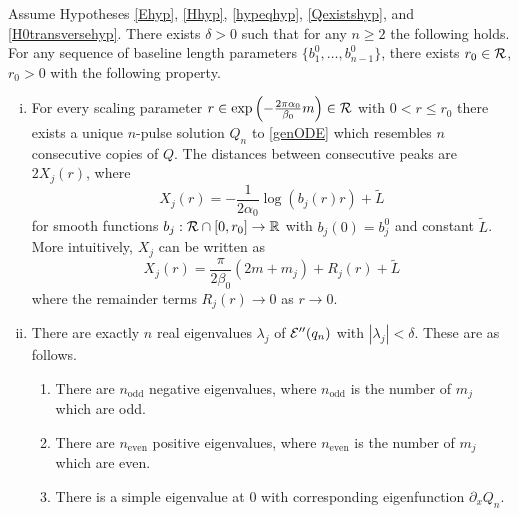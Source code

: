 \documentclass[thesis.tex]{subfiles}
\begin{document}
\begin{theorem}\label{multipulseexistR}
Assume Hypotheses \ref{Ehyp}, \ref{Hhyp}, \ref{hypeqhyp}, \ref{Qexistshyp}, and \ref{H0transversehyp}. There exists $\delta > 0$ such that for any $n \geq 2$ the following holds. For any sequence of baseline length parameters $\{ b_1^0, \dots, b_{n-1}^0 \}$, there exists $r_0 \in \mathcal{R}$, $r_0 > 0$ with the following property.
\begin{enumerate}[(i)]
\item For every scaling parameter $r \in \mathop\mathrm{exp}\nolimits\left(-\frac{2 \pi \alpha_0}{\beta_0}m \right) \in \mathcal{R}$ with $0 < r \leq r_0$ there exists a unique $n$-pulse solution $Q_n$ to \cref{genODE} which resembles $n$ consecutive copies of $Q$. The distances between consecutive peaks are $2 X_j(r)$, where
\begin{equation}\label{nhompeaks}
X_j(r) = -\frac{1}{2 \alpha_0} \log(b_j(r)r) + \tilde{L}
\end{equation}
for smooth functions $b_j: \mathcal{R}\cap[0,r_0] \rightarrow \mathbb{R}$ with $b_j(0) = b_j^0$ and constant $\tilde{L}$. More intuitively, $X_j$ can be written as
\[
X_j(r) = \frac{\pi}{2 \beta_0}(2 m + m_j) + R_j(r) + \tilde{L}
\]
where the remainder terms $R_j(r) \rightarrow 0$ as $r \rightarrow 0$.

\item There are exactly $n$ real eigenvalues $\lambda_j$ of $\mathcal{E}''(q_n)$ with $|\lambda_j| < \delta$. These are as follows.
\begin{enumerate}
	\item There are $n_{\text{odd}}$ negative eigenvalues, where $n_{\text{odd}}$ is the number of $m_j$ which are odd.
	\item There are $n_{\text{even}}$ positive eigenvalues, where $n_{\text{even}}$ is the number of $m_j$ which are even.
	\item There is a simple eigenvalue at 0 with corresponding eigenfunction $\partial_x Q_n$.
\end{enumerate}


\end{enumerate}
\end{theorem}
\end{document}
